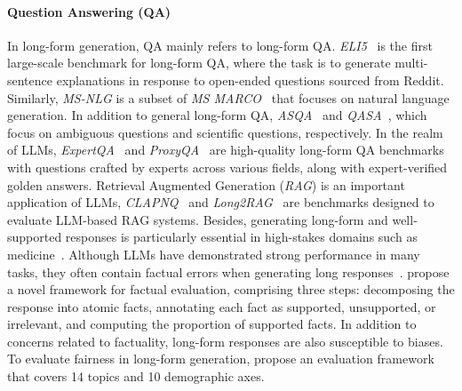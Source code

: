 \documentclass[11pt, a4paper, logo, copyright, nonumbering]{map}
\begin{document}
\paragraph{Question Answering (QA)} In long-form generation, QA mainly refers to long-form QA. \textit{ELI5}~\citep{fan2019eli5} is the first large-scale benchmark for long-form QA, where the task is to generate multi-sentence explanations in response to open-ended questions sourced from Reddit. Similarly, \textit{MS-NLG} is a subset of \textit{MS MARCO}~\citep{nguyen2016ms} that focuses on natural language generation. In addition to general long-form QA, \textit{ASQA}~\citep{stelmakh2022asqa} and \textit{QASA}~\citep{lee2023qasa}, which focus on ambiguous questions and scientific questions, respectively. In the realm of LLMs, \textit{ExpertQA}~\citep{malaviya2023expertqa} and \textit{ProxyQA}~\citep{tan2024proxyqa} are high-quality long-form QA benchmarks with questions crafted by experts across various fields, along with expert-verified golden answers. Retrieval Augmented Generation (\textit{RAG}) is an important application of LLMs, \textit{CLAPNQ}~\citep{rosenthal2024clapnq} and \textit{Long2RAG}~\citep{qi2024long2rag} are benchmarks designed to evaluate LLM-based RAG systems. Besides, generating long-form and well-supported responses is particularly essential in high-stakes domains such as medicine~\citep{hosseini2024benchmark,jeong2024olaph}. 
Although LLMs have demonstrated strong performance in many tasks, they often contain factual errors when generating long responses~\citep{wei2024long}. \citet{min2023factscore} propose a novel framework for factual evaluation, comprising three steps: decomposing the response into atomic facts, annotating each fact as supported, unsupported, or irrelevant, and computing the proportion of supported facts. 
In addition to concerns related to factuality, long-form responses are also susceptible to biases. To evaluate fairness in long-form generation, \citet{jeung2024large} propose an evaluation framework that covers 14 topics and 10 demographic axes.
\end{document}
